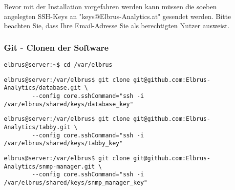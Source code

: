 \documentclass{article}
\begin{document}
	Bevor mit der Installation vorgefahren werden kann müssen die soeben angelegten SSH-Keys an "keys@Elbrus-Analytics.at" gesendet werden. Bitte beachten Sie, dass Ihre Email-Adresse Sie als berechtigten Nutzer ausweist.
	
	\subsubsection{Git - Clonen der Software}

	\lstset{style=commands}
	\begin{lstlisting}[caption={Wechseln des Verzeichnisses.}]
		elbrus@server:~$ cd /var/elbrus
	\end{lstlisting}
	
	\lstset{style=commands}
	\begin{lstlisting}[caption={Clonen der Datenbank Software.}]
		elbrus@server:/var/elbrus$ git clone git@github.com:Elbrus-Analytics/database.git \
		--config core.sshCommand="ssh -i /var/elbrus/shared/keys/database_key"
	\end{lstlisting}
	

	
	\lstset{style=commands}
	\begin{lstlisting}[caption={Clonen der Kernsoftware 'tabby'.}]
		elbrus@server:/var/elbrus$ git clone git@github.com:Elbrus-Analytics/tabby.git \
		--config core.sshCommand="ssh -i /var/elbrus/shared/keys/tabby_key"
	\end{lstlisting}
	
	\lstset{style=commands}
	\begin{lstlisting}[caption={Clonen der 'SNMP-Manager' Software.}]
		elbrus@server:/var/elbrus$ git clone git@github.com:Elbrus-Analytics/snmp-manager.git \
		--config core.sshCommand="ssh -i /var/elbrus/shared/keys/snmp_manager_key"
	\end{lstlisting}
\end{document}
